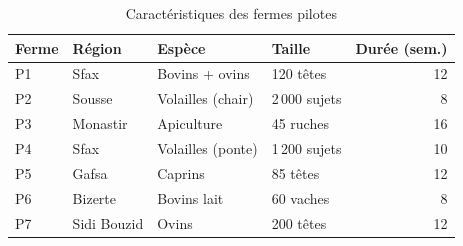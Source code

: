 \begin{table}[H]
\centering
\caption{Caractéristiques des fermes pilotes}
\label{tab:fermes_pilotes}
\begin{tabular}{llllr}
\toprule
\textbf{Ferme} & \textbf{Région} & \textbf{Espèce} & \textbf{Taille} & \textbf{Durée (sem.)} \\
\midrule
P1 & Sfax    & Bovins + ovins  & 120 têtes  & 12 \\
P2 & Sousse  & Volailles (chair)& 2\,000 sujets & 8 \\
P3 & Monastir& Apiculture      & 45 ruches  & 16 \\
P4 & Sfax    & Volailles (ponte)& 1\,200 sujets & 10 \\
P5 & Gafsa   & Caprins         & 85 têtes   & 12 \\
P6 & Bizerte & Bovins lait     & 60 vaches  & 8 \\
P7 & Sidi Bouzid & Ovins      & 200 têtes  & 12 \\
\bottomrule
\end{tabular}
\end{table}

